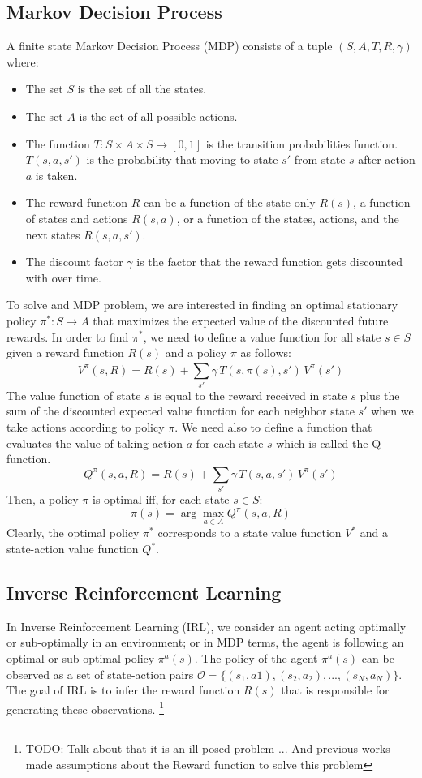 \documentclass[conference]{IEEEtran}
\begin{document}
\subsection{Markov Decision Process}
A finite state Markov Decision Process (MDP) \cite{puterman2014markov} consists of a tuple $(S,A,T,R,\gamma)$ where:
\begin{itemize}
    \item The set $S$ is the set of all the states.
    \item The set $A$ is the set of all possible actions.
    \item The function $T : S\times A\times S \mapsto [0,1]$ is the transition probabilities function. $T(s,a,s')$ is the probability that moving to state $s'$ from state $s$ after action $a$ is taken.
    \item The reward function $R$ can be a function of the state only $R(s)$, a function of states and actions $R(s,a)$, or a function of the states, actions, and the next states $R(s,a,s')$.
    \item The discount factor $\gamma$ is the factor that the reward function gets discounted with over time.
\end{itemize}
To solve and MDP problem, we are interested in finding an optimal stationary policy $\pi^*: S \mapsto A$ that maximizes the expected value of the discounted future rewards.
In order to find $\pi^*$, we need to define a value function for all state $s \in S$ given a reward function $R(s)$ and a policy $\pi$ as follows:
\[ V^\pi(s,R) = R(s) + \sum_{s'}^{}\gamma\,T(s,\pi(s),s')\,V^\pi(s') \]
The value function of state $s$ is equal to the reward received in state $s$ plus the sum of the discounted expected value function for each neighbor state $s'$ when we take actions according to policy $\pi$.
We need also to define a function that evaluates the value of taking action $a$ for each state $s$ which is called the Q-function.
\[Q^\pi(s,a,R) = R(s) + \sum_{s'}{} \gamma\,T(s,a,s')\,V^\pi(s') \]
Then, a policy $\pi$ is optimal iff, for each state $s \in S$:
\[ \pi(s) = \arg\!\max_{a\in A} Q^\pi(s,a,R)\]
Clearly, the optimal policy $\pi^*$ corresponds to a state value function $V^*$ and a state-action value function $Q^*$.
\subsection{Inverse Reinforcement Learning}
In Inverse Reinforcement Learning (IRL), we consider an agent acting optimally or sub-optimally in an environment; or in MDP terms, the agent is following an optimal or sub-optimal policy $\pi^a(s)$. The policy of the agent $\pi^a(s)$ can be observed as a set of state-action pairs $\mathcal{O} = \{(s_1,a1),(s_2,a_2), ...,(s_N,a_N)\}$. The goal of IRL is to infer the reward function $R(s)$ that is responsible for generating these observations.
\footnote{TODO: Talk about that it is an ill-posed problem ... And previous works made assumptions about the Reward function to solve this problem}
\end{document}
